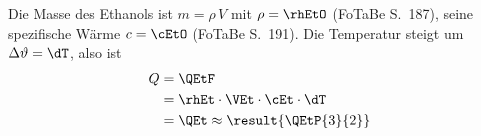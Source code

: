 Die Masse des Ethanols ist $m = \rho\,V$ mit $\rho = \rhEtO$ (FoTaBe S.~187), seine spezifische Wärme $c = \cEtO$ (FoTaBe S.~191). Die Temperatur steigt um $\Delta\vartheta = \dT$, also ist
\begin{align}
 Q &= \QEtF \\
   &= \rhEt\cdot\VEt\cdot\cEt\cdot\dT \\
   &= \QEt \approx \result{\QEtP{3}{2}}
\end{align}

